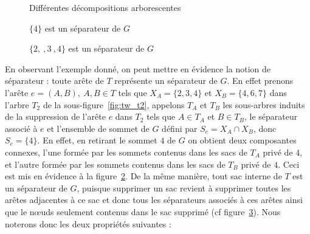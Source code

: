 \begin{figure}
    \begin{center}
        \subfloat[$T_1$]{\label{fig:tw_t1}
            \begin{tikzpicture}
                
            \end{tikzpicture}
        }
        \subfloat[$T_2$]{\label{fig:tw_t2}
            \begin{tikzpicture}
                
            \end{tikzpicture}
        }
        \subfloat[$T_3$]{\label{fig:tw_t3}
            \begin{tikzpicture}
                
            \end{tikzpicture}
        }
        \caption{Différentes décompositions arborescentes}
        \label{tw_trees}
    \end{center}
\end{figure}

\begin{figure}
    \begin{center}
        \begin{tikzpicture}
            
        \end{tikzpicture}
        \caption{$\{4\}$ est un séparateur de $G$}
        \label{tw_sep}
    \end{center}
\end{figure}

\begin{figure}
    \begin{center}
        \begin{tikzpicture}
            
        \end{tikzpicture}
        \caption{$\{2,\ ,3\ ,4\}$ est un séparateur de $G$}
        \label{tw_bsep}
    \end{center}
\end{figure}


En observant l'exemple donné, on peut mettre en évidence la notion de séparateur : toute arête de
$T$ représente un séparateur de $G$. En effet prenons l'arête $e = (A, B),\ A, B \in T$ tels que
$X_A = \{2, 3, 4\}$ et $X_B = \{4, 6, 7\}$ dans l'arbre $T_2$ de la sous-figure~\ref{fig:tw_t2},
appelons $T_A$ et $T_B$ les sous-arbres induits de la suppression de l'arête $e$ dans $T_2$ tels que
$A \in T_A$ et $B \in T_B$, le séparateur associé à $e$ et l'ensemble de sommet de $G$ défini par
$S_e = X_A \cap X_B$, donc $S_e = \{4\}$. En effet, en retirant le sommet $4$ de $G$ on obtient deux
composantes connexes, l'une formée par les sommets contenus dans les sacs de $T_A$ privé de $4$, et
l'autre formée par les sommets contenus dans les sacs de $T_B$ privé de $4$. Ceci est mis en
évidence à la figure~\ref{tw_sep}. De la même manière, tout sac interne de $T$ est un séparateur de
$G$, puisque supprimer un sac revient à supprimer toutes les arêtes adjacentes à ce sac et donc tous
les séparateurs associés à ces arêtes ainsi que le n\oe uds seulement contenus dans le sac supprimé
(cf figure~\ref{tw_bsep}). Nous noterons donc les deux propriétés suivantes :

